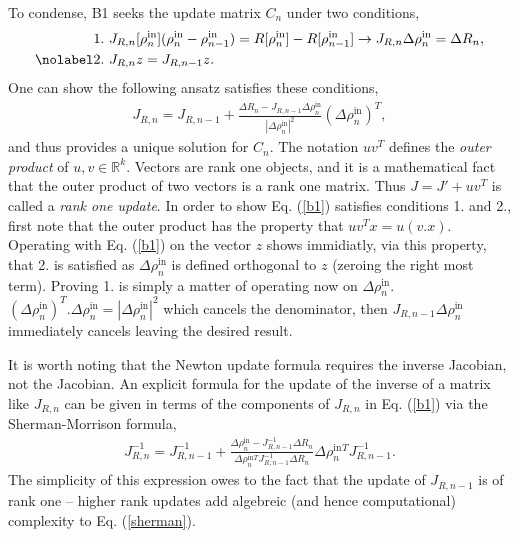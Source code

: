 To condense, B1 seeks the update matrix $C_n$ under two conditions,
\begin{align}
1.& \text{ } J_{R,n}[\rho^{\text{in}}_{n}] (\rho^{\text{in}}_{n} - \rho^{\text{in}}_{n-1})= R[\rho^{\text{in}}_{n}] - R[\rho^{\text{in}}_{n-1}] \rightarrow J_{R,n} \Delta \rho^{\text{in}}_n = \Delta R_n, \\ \nolabel
2.& \text{ } J_{R,n} z = J_{R,n-1} z.
\end{align}
One can show the following ansatz satisfies these conditions,
\begin{align}\label{b1}
J_{R,n} =  J_{R,n-1} + \frac{\Delta R_n - J_{R,n-1} \Delta \rho^{\text{in}}_n}{ |\Delta \rho^{\text{in}}_n |^2 } (\Delta \rho^{\text{in}}_n)^T,
\end{align}
and thus provides a unique solution for $C_n$. The notation $uv^T$ defines the \textit{outer product} of $u, v \in \mathbb{R}^k$. Vectors are rank one objects, and it is a mathematical fact that the outer product of two vectors is a rank one matrix. Thus $J = J' + uv^T$ is called a \textit{rank one update}. In order to show Eq$.$ (\ref{b1}) satisfies conditions 1$.$ and 2$.$, first note that the outer product has the property that $uv^Tx = u(v.x)$. Operating with Eq$.$ (\ref{b1}) on the vector $z$ shows immidiatly, via this property, that 2$.$ is satisfied as $ \Delta \rho^{\text{in}}_n$ is defined orthogonal to $z$ (zeroing the right most term). Proving 1$.$ is simply a matter of operating now on $\Delta \rho^{\text{in}}_n$. $ (\Delta \rho^{\text{in}}_n)^T.\Delta \rho^{\text{in}}_n = | \Delta \rho^{\text{in}}_n |^2$ which cancels the denominator, then $J_{R,n-1} \Delta \rho^{\text{in}}_n$ immediately cancels leaving the desired result. 

It is worth noting that the Newton update formula requires the inverse Jacobian, not the Jacobian. An explicit formula for the update of the inverse of a matrix like $J_{R,n}$ can be given in terms of the components of $J_{R,n}$ in Eq$.$ (\ref{b1}) via the Sherman-Morrison formula,
\begin{gather}
\label{sherman}
J_{R,n}^{-1} =  J_{R,n-1}^{-1} + \frac{\Delta \rho^{\text{in}}_n - J_{R,n-1}^{-1} \Delta R_n }{\Delta \rho^{\text{in}}_n^T  J_{R,n-1}^{-1}  \Delta R_n } \Delta \rho^{\text{in}}_n^T J_{R,n-1}^{-1}.
\end{gather}
The simplicity of this expression owes to the fact that the update of $ J_{R,n-1}$ is of rank one -- higher rank updates add algebreic (and hence computational) complexity to Eq$.$ (\ref{sherman}).


